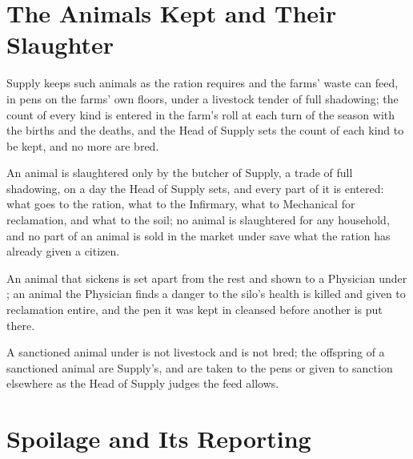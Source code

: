 \section{The Animals Kept and Their Slaughter}
\label{sec:supply:animals-kept-and-their-slaughter}

\begin{clauses}
\item Supply keeps such animals as the ration requires and the farms' waste can feed, in pens on the farms' own floors, under a livestock tender of full shadowing; the count of every kind is entered in the farm's roll at each turn of the season with the births and the deaths, and the Head of Supply sets the count of each kind to be kept, and no more are bred.
\item An animal is slaughtered only by the butcher of Supply, a trade of full shadowing, on a day the Head of Supply sets, and every part of it is entered: what goes to the ration, what to the Infirmary, what to Mechanical for reclamation, and what to the soil; no animal is slaughtered for any household, and no part of an animal is sold in the market under  save what the ration has already given a citizen.
\item An animal that sickens is set apart from the rest and shown to a Physician under ; an animal the Physician finds a danger to the silo's health is killed and given to reclamation entire, and the pen it was kept in cleansed before another is put there.
\item A sanctioned animal under  is not livestock and is not bred; the offspring of a sanctioned animal are Supply's, and are taken to the pens or given to sanction elsewhere as the Head of Supply judges the feed allows.
\end{clauses}

\section{Spoilage and Its Reporting}
\label{sec:supply:spoilage-and-its-reporting}

